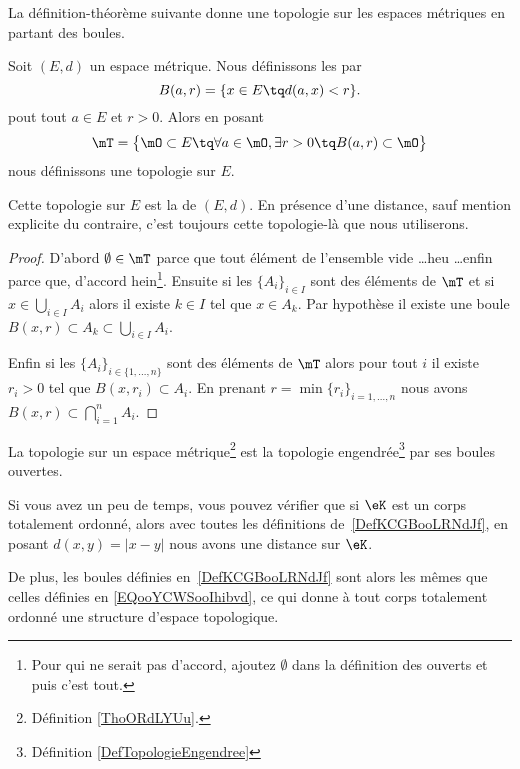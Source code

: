 La définition-théorème suivante donne une topologie sur les espaces métriques en partant des boules.

\begin{theoremDef}     \label{ThoORdLYUu}
	Soit \( (E,d)\) un espace métrique. Nous définissons les  par
	\begin{equation}        \label{EQooYCWSooIhibvd}
		B(a,r)=\{ x\in E\tq d(a,x)<r \}.
	\end{equation}
	pout tout \( a\in E\) et \( r>0\).
	Alors en posant
	\begin{equation}        \label{EqGDVVooDZfwSf}
		\mT=\big\{  \mO\subset E  \tq\forall a\in \mO,\exists r>0\tq B(a,r)\subset \mO \big\}
	\end{equation}
	nous définissons une topologie sur \( E\).

	Cette topologie sur \( E\) est la  de \( (E,d)\). En présence d'une distance, sauf mention explicite du contraire, c'est toujours cette topologie-là que nous utiliserons.
\end{theoremDef}

\begin{proof}
	D'abord \( \emptyset\in\mT\) parce que tout élément de l'ensemble vide \ldots heu \ldots enfin parce que, d'accord hein\footnote{Pour qui ne serait pas d'accord, ajoutez \( \emptyset\) dans la définition des ouverts et puis c'est tout.}. Ensuite si les \( \{A_i\}_{i\in I}\) sont des éléments de \( \mT\) et si \( x\in\bigcup_{i\in I}A_i\) alors il existe \( k\in I\) tel que \( x\in A_k\). Par hypothèse il existe une boule \( B(x,r)\subset A_k\subset\bigcup_{i\in I}A_i\).

	Enfin si les \( \{A_i\}_{i\in\{ 1,\ldots, n \}}\) sont des éléments de \( \mT\) alors pour tout \( i\) il existe \( r_i>0\) tel que \( B(x,r_i)\subset A_i\). En prenant \( r=\min\{ r_i \}_{i=1,\ldots, n}\) nous avons \( B(x,r)\subset\bigcap_{i=1}^nA_i.\)
\end{proof}

\begin{proposition}     \label{PROPooZXTXooEMLgMn}
	La topologie sur un espace métrique\footnote{Définition \ref{ThoORdLYUu}.} est la topologie engendrée\footnote{Définition \ref{DefTopologieEngendree}} par ses boules ouvertes.
\end{proposition}

\begin{normaltext}      \label{NORMooJBMXooLHfAJK}
	Si vous avez un peu de temps, vous pouvez vérifier que si \( \eK\) est un corps totalement ordonné, alors avec toutes les définitions de~\ref{DefKCGBooLRNdJf}, en posant \( d(x,y)=| x-y |\) nous avons une distance sur \( \eK\).

	De plus, les boules définies en~\ref{DefKCGBooLRNdJf} sont alors les mêmes que celles définies en \eqref{EQooYCWSooIhibvd}, ce qui donne à tout corps totalement ordonné une structure d'espace topologique.
\end{normaltext}

